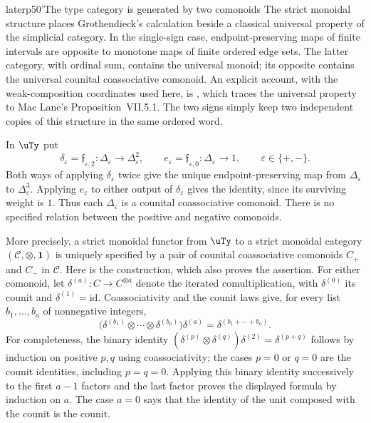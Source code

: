 \begin{dcomment}{later}{p50'}{The type category is generated by two comonoids}
The strict monoidal structure places Grothendieck's calculation beside a classical universal property of the simplicial category. In the single-sign case, endpoint-preserving maps of finite intervals are opposite to monotone maps of finite ordered edge sets. The latter category, with ordinal sum, contains the universal monoid; its opposite contains the universal counital coassociative comonoid. An explicit account, with the weak-composition coordinates used here, is \citet[Appendix~D.1--D.2, especially Proposition~D.2, pp.~713--716]{AguiarMahajan2010}, which traces the universal property to Mac Lane's Proposition~VII.5.1. The two signs simply keep two independent copies of this structure in the same ordered word.

In $\uTy$ put
\[
 \delta_\varepsilon=\mathfrak f_{\varepsilon,2}:
      \Delta_\varepsilon\longrightarrow\Delta_\varepsilon^2,
 \qquad
 e_\varepsilon=\mathfrak f_{\varepsilon,0}:
      \Delta_\varepsilon\longrightarrow1,
 \qquad \varepsilon\in\{+,-\}.
\]
Both ways of applying $\delta_\varepsilon$ twice give the unique endpoint-preserving map from $\Delta_\varepsilon$ to $\Delta_\varepsilon^3$. Applying $e_\varepsilon$ to either output of $\delta_\varepsilon$ gives the identity, since its surviving weight is $1$. Thus each $\Delta_\varepsilon$ is a counital coassociative comonoid. There is no specified relation between the positive and negative comonoids.

More precisely, a strict monoidal functor from $\uTy$ to a strict monoidal category $(\mathcal C,\otimes,\mathbf1)$ is uniquely specified by a pair of counital coassociative comonoids $C_+$ and $C_-$ in $\mathcal C$. Here is the construction, which also proves the assertion. For either comonoid, let $\delta^{(a)}:C\to C^{\otimes a}$ denote the iterated comultiplication, with $\delta^{(0)}$ its counit and $\delta^{(1)}=\mathrm{id}$. Coassociativity and the counit laws give, for every list $b_1,\ldots,b_a$ of nonnegative integers,
\[
 \bigl(\delta^{(b_1)}\otimes\cdots\otimes\delta^{(b_a)}\bigr)
       \delta^{(a)}
 =\delta^{(b_1+\cdots+b_a)}.
\]
For completeness, the binary identity
$(\delta^{(p)}\otimes\delta^{(q)})\delta^{(2)}
 =\delta^{(p+q)}$ follows by induction on positive $p,q$ using coassociativity; the cases $p=0$ or $q=0$ are the counit identities, including $p=q=0$. Applying this binary identity successively to the first $a-1$ factors and the last factor proves the displayed formula by induction on $a$. The case $a=0$ says that the identity of the unit composed with the counit is the counit.


\end{dcomment}
